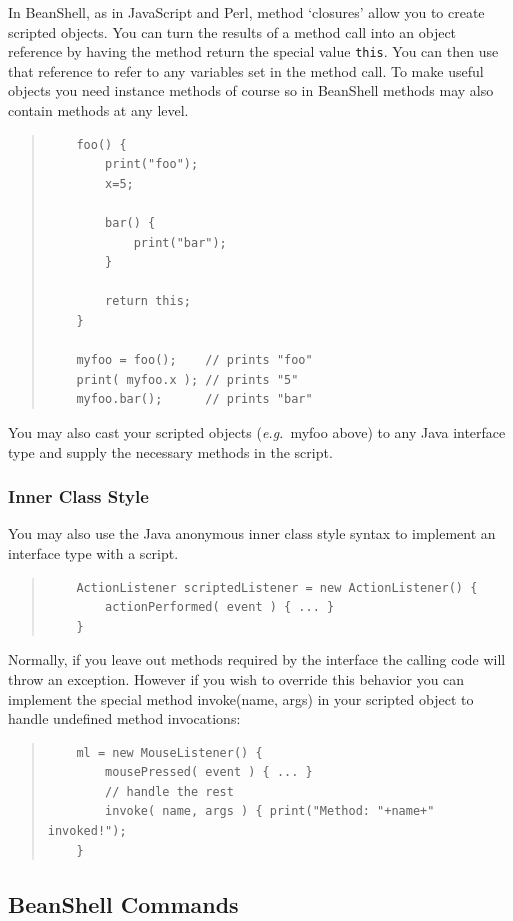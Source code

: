 \documentclass[twoside,11pt]{article}
\renewcommand{\_}{\texttt{\symbol{95}}}
\newcommand{\eg}{\textit{e.g.}}
\begin{document}
In BeanShell, as in JavaScript and Perl, method `closures' allow you
to create scripted objects.  You can turn the results of a method call
into an object reference by having the method return the special value
\texttt{this}.  You can then use that reference to refer to
any variables set in the method call.  To make useful objects you need
instance methods of course so in BeanShell methods may also contain
methods at any level.
\begin{quote}
\begin{verbatim}
    foo() {
        print("foo");
        x=5;

        bar() {
            print("bar");
        }

        return this;
    }

    myfoo = foo();    // prints "foo"
    print( myfoo.x ); // prints "5"
    myfoo.bar();      // prints "bar"
\end{verbatim}
\end{quote}

You may also cast your scripted objects (\eg\ myfoo above) to any Java
interface type and supply the necessary methods in the script.

\subsubsection{Inner Class Style}

You may also use the Java anonymous inner class style syntax to implement an
interface type with a script.
\begin{quote}
\begin{verbatim}
    ActionListener scriptedListener = new ActionListener() {
        actionPerformed( event ) { ... }
    }
\end{verbatim}
\end{quote}
Normally, if you leave out methods required by the interface the calling code
will throw an exception.  However if you wish to override this behavior
you can implement the special method invoke(name, args) in your scripted
object to handle undefined method invocations:
\begin{quote}
\begin{verbatim}
    ml = new MouseListener() {
        mousePressed( event ) { ... }
        // handle the rest
        invoke( name, args ) { print("Method: "+name+" invoked!");
    }
\end{verbatim}
\end{quote}

\subsection{BeanShell Commands}
\end{document}
